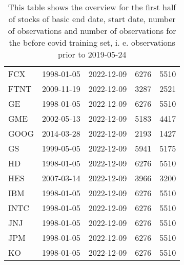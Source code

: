 \begin{table}[ht]
\begin{tabular}{lllrr}
  FCX & 1998-01-05 & 2022-12-09 & 6276 & 5510 \\ 
  FTNT & 2009-11-19 & 2022-12-09 & 3287 & 2521 \\ 
  GE & 1998-01-05 & 2022-12-09 & 6276 & 5510 \\ 
  GME & 2002-05-13 & 2022-12-09 & 5183 & 4417 \\ 
  GOOG & 2014-03-28 & 2022-12-09 & 2193 & 1427 \\ 
  GS & 1999-05-05 & 2022-12-09 & 5941 & 5175 \\ 
  HD & 1998-01-05 & 2022-12-09 & 6276 & 5510 \\ 
  HES & 2007-03-14 & 2022-12-09 & 3966 & 3200 \\ 
  IBM & 1998-01-05 & 2022-12-09 & 6276 & 5510 \\ 
  INTC & 1998-01-05 & 2022-12-09 & 6276 & 5510 \\ 
  JNJ & 1998-01-05 & 2022-12-09 & 6276 & 5510 \\ 
  JPM & 1998-01-05 & 2022-12-09 & 6276 & 5510 \\ 
  KO & 1998-01-05 & 2022-12-09 & 6276 & 5510 \\ 
   \hline
\end{tabular}
\caption[Overview_1]{This table shows the overview for the first half of stocks of basic end date, start date, number of observations and number of observations 
                     for the before covid training set, i. e. observations prior to 2019-05-24} 
\label{Table:Overview_1}
\end{table}
